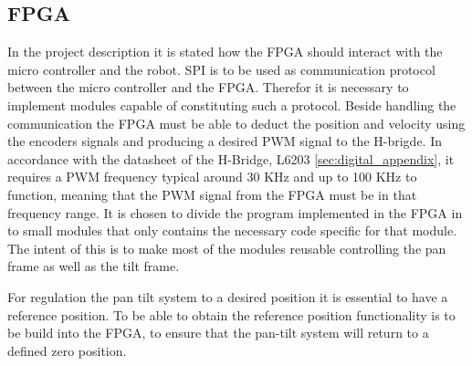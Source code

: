 \documentclass[../../main.tex]{subfiles}
\begin{document}
\subsection*{FPGA}
In the project description it is stated how the FPGA should interact with the micro controller and the robot.
SPI is to be used as communication protocol between the micro controller and the FPGA. Therefor it is necessary to implement modules capable of constituting such a protocol. Beside handling the communication the FPGA must be able to deduct the position and velocity using the encoders signals and producing a desired PWM signal to the H-brigde. In accordance with the datasheet of the H-Bridge, L6203 \ref{sec:digital_appendix}, it requires a PWM frequency typical around 30 KHz and up to 100 KHz to function, meaning that the PWM signal from the FPGA must be in that frequency range. 
It is chosen to divide the program implemented in the FPGA in to small modules that only contains the necessary code specific for that module. The intent of this is to make most of the modules reusable controlling the pan frame as well as the tilt frame.

For regulation the pan tilt system to a desired position it is essential to have a reference position. To be able to obtain the reference position functionality is to be build into the FPGA, to ensure that the pan-tilt system will return to a defined zero position. 
\end{document}
